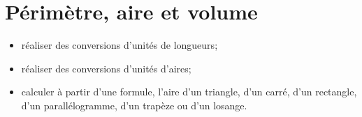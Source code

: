 \chapter{Périmètre, aire et volume}\label{ChPerimetresAires}

\begin{acquis}
\begin{itemize}
\item réaliser des conversions d'unités de longueurs;
\item réaliser des conversions d'unités d'aires;
\item calculer à partir d'une formule, l'aire d'un triangle, d'un carré, d'un rectangle, d'un parallélogramme, d'un trapèze ou d'un losange.
\end{itemize}
\end{acquis}

\activites



\cours


\exercicesbase
\begin{colonne*exercice}

\end{colonne*exercice}


\exercicesappr
\begin{colonne*exercice}

\end{colonne*exercice}

\connaissances


\TravauxPratiques %


\pagebreak

\recreation



